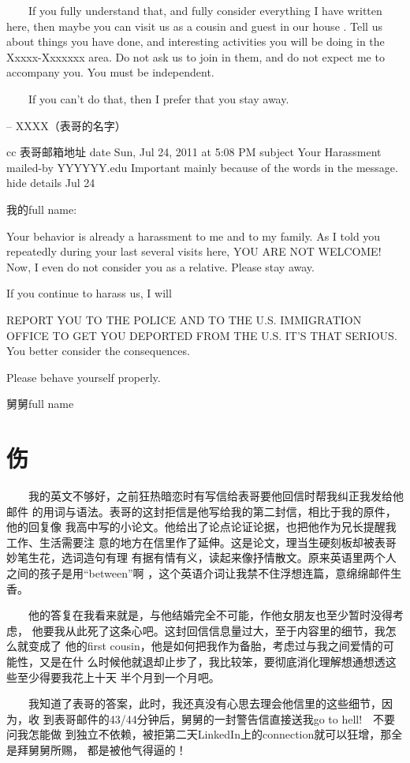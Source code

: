 \documentclass[12pt]{book}
\begin{document}
　　If you fully understand that, and fully consider everything I have 
written here, then maybe you can visit us as a cousin and guest in our house
.  Tell us about things you have done, and interesting activities you will 
be doing in the Xxxxx-Xxxxxxx area.  Do not ask us to join in them, and do 
not expect me to accompany you.  You must be independent. 

　　If you can’t do that, then I prefer that you stay away. 

--
XXXX（表哥的名字）

cc    表哥邮箱地址
date     Sun, Jul 24, 2011 at 5:08 PM
subject     Your Harassment
mailed-by     YYYYYY.edu
Important mainly because of the words in the message.
    hide details Jul 24 

我的full name:

Your behavior is already a harassment to me and to my family.
As I told you repeatedly during your last several visits here,
YOU ARE NOT WELCOME!
Now, I even do not consider you as a relative.
Please stay away.

If you continue to harass us, I will

REPORT YOU TO THE POLICE AND TO THE U.S. IMMIGRATION OFFICE
TO GET YOU DEPORTED FROM THE U.S.
IT'S THAT SERIOUS. You better consider the consequences.

Please behave yourself properly.

舅舅full name
\section{伤}
\label{sec-8-26}

　　我的英文不够好，之前狂热暗恋时有写信给表哥要他回信时帮我纠正我发给他邮件
的用词与语法。表哥的这封拒信是他写给我的第二封信，相比于我的原件，他的回复像
我高中写的小论文。他给出了论点论证论据，也把他作为兄长提醒我工作、生活需要注
意的地方在信里作了延伸。这是论文，理当生硬刻板却被表哥妙笔生花，选词造句有理
有据有情有义，读起来像抒情散文。原来英语里两个人之间的孩子是用“between”啊
，这个英语介词让我禁不住浮想连篇，意绵绵邮件生香。

　　他的答复在我看来就是，与他结婚完全不可能，作他女朋友也至少暂时没得考虑，
他要我从此死了这条心吧。这封回信信息量过大，至于内容里的细节，我怎么就变成了
他的first cousin，他是如何把我作为备胎，考虑过与我之间爱情的可能性，又是在什
么时候他就退却止步了，我比较笨，要彻底消化理解想通想透这些至少得要我花上十天
半个月到一个月吧。

　　我知道了表哥的答案，此时，我还真没有心思去理会他信里的这些细节，因为，收
到表哥邮件的43/44分钟后，舅舅的一封警告信直接送我go to hell!　不要问我怎能做
到独立不依赖，被拒第二天LinkedIn上的connection就可以狂增，那全是拜舅舅所赐，
都是被他气得逼的！
\end{document}
